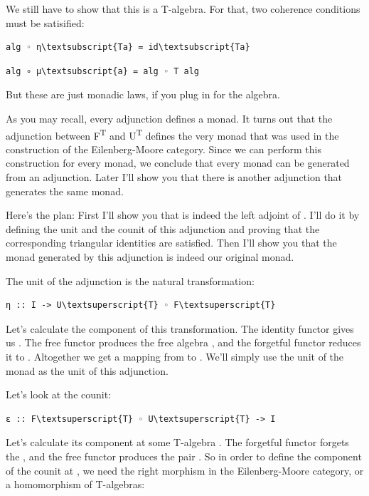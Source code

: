 We still have to show that this is a T-algebra. For that, two coherence
conditions must be satisified:

\begin{Verbatim}[commandchars=\\\{\}]
alg ◦ η\textsubscript{Ta} = id\textsubscript{Ta}
\end{Verbatim}
\begin{Verbatim}[commandchars=\\\{\}]
alg ∘ μ\textsubscript{a} = alg ◦ T alg
\end{Verbatim}
But these are just monadic laws, if you plug in  for the
algebra.

As you may recall, every adjunction defines a monad. It turns out that
the adjunction between F\textsuperscript{T} and U\textsuperscript{T}
defines the very monad  that was used in the construction of
the Eilenberg-Moore category. Since we can perform this construction for
every monad, we conclude that every monad can be generated from an
adjunction. Later I'll show you that there is another adjunction that
generates the same monad.

Here's the plan: First I'll show you that  is indeed the left
adjoint of . I'll do it by defining the unit and the counit
of this adjunction and proving that the corresponding triangular
identities are satisfied. Then I'll show you that the monad generated by
this adjunction is indeed our original monad.

The unit of the adjunction is the natural transformation:

\begin{Verbatim}[commandchars=\\\{\}]
η :: I -> U\textsuperscript{T} ◦ F\textsuperscript{T}
\end{Verbatim}
Let's calculate the  component of this transformation. The
identity functor gives us . The free functor produces the free
algebra , and the forgetful functor reduces it to
. Altogether we get a mapping from  to
. We'll simply use the unit of the monad  as the
unit of this adjunction.

Let's look at the counit:

\begin{Verbatim}[commandchars=\\\{\}]
ε :: F\textsuperscript{T} ◦ U\textsuperscript{T} -> I
\end{Verbatim}
Let's calculate its component at some T-algebra . The
forgetful functor forgets the , and the free functor produces
the pair . So in order to define the component of
the counit  at , we need the right morphism in
the Eilenberg-Moore category, or a homomorphism of T-algebras:

